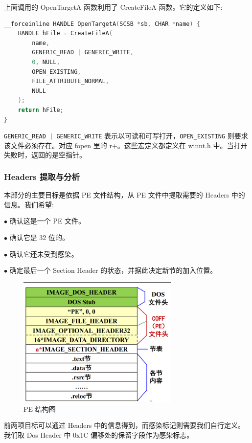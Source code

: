 \documentclass[UTF8]{ctexart}
\begin{document}
    上面调用的 OpenTargetA 函数利用了 CreateFileA 函数。它的定义如下:

    \begin{lstlisting}[language=C, caption={OpenTargetA}, captionpos=b]
__forceinline HANDLE OpenTargetA(SCSB *sb, CHAR *name) {
    HANDLE hFile = CreateFileA(
        name,
        GENERIC_READ | GENERIC_WRITE,
        0, NULL,
        OPEN_EXISTING,
        FILE_ATTRIBUTE_NORMAL,
        NULL
    );
    return hFile;
}
    \end{lstlisting}

    \lstinline{GENERIC_READ | GENERIC_WRITE} 表示以可读和可写打开，\lstinline{OPEN_EXISTING} 则要求该文件必须存在。对应 fopen 里的 r+。这些宏定义都定义在 winnt.h 中。当打开失败时，返回的是空指针。
    
    \subsubsection{Headers 提取与分析\label{sec:PE headers}}

    本部分的主要目标是依据 PE 文件结构，从 PE 文件中提取需要的 Headers 中的信息。我们希望:
    
    $\bullet$ 确认这是一个 PE 文件。
    
    $\bullet$ 确认它是 32 位的。
    
    $\bullet$ 确认它还未受到感染。
    
    $\bullet$ 确定最后一个 Section Header 的状态，并据此决定新节的加入位置。

    \begin{figure}[H]
        \centering
        \includegraphics[width=8cm]{.asset/pe-headers.png}
        \caption{PE 结构图}
        \label{fig:pe arch}
    \end{figure}

    前两项目标可以通过 Headers 中的信息得到，而感染标记则需要我们自行定义。我们取 Dos Header 中 0x1C 偏移处的保留字段作为感染标志。
    
\end{document}
